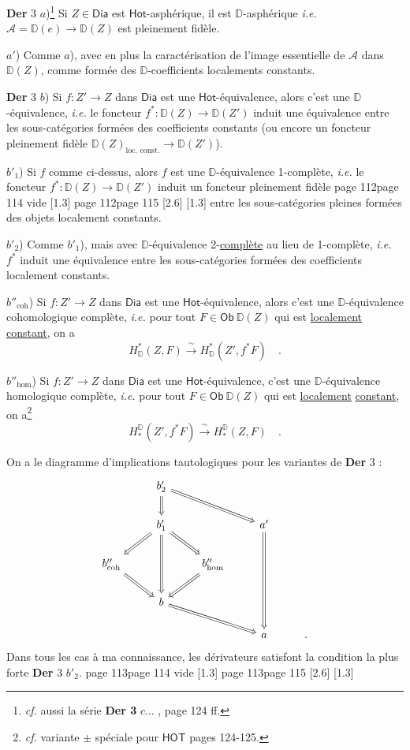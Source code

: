 \documentclass[11pt,leqno]{article}
\newcommand{\printedpage}[1]{\marginnote{\scriptsize\sffamily ed.\ #1}}
\newcommand{\msp}[1]{%
  \begingroup\def\thismsp{#1}\def\blankmsp{page 114 vide}%
  \ifx\thismsp\blankmsp
    \marginnote{\scriptsize\sffamily [114: vide]}[1.3\baselineskip]%
  \else\def\followingmsp{page 115}%
    \ifx\thismsp\followingmsp
      \marginnote{\scriptsize\sffamily [page 115]}[2.6\baselineskip]%
    \else\marginnote{\scriptsize\sffamily [#1]}[1.3\baselineskip]\fi
  \fi\endgroup}
\newcommand{\DD}{\ensuremath{\mathbb{D}}}
\newcommand{\Dia}{\ensuremath{\mathsf{Dia}}}
\newcommand{\Hot}{\ensuremath{\mathsf{Hot}}}
\newcommand{\HOT}{\ensuremath{\mathsf{HOT}}}
\begin{document}
\textbf{Der} 3 $a$)\footnote[58]{\textit{cf.} aussi la série \textbf{Der 3} $c \ldots$ , page 124 ff.} Si $Z \in \mathsf{Dia}$ est \Hot-asphérique, il est $\DD$-asphérique \textit{i.e.} $\mathcal{A} = \DD(e) \to \DD(Z)$ est pleinement fidèle. %

$a'$) Comme $a$), avec en plus la caractérisation de l'image essentielle de $\mathcal{A}$ dans $\DD(Z)$, comme formée des $\DD$-coefficients localements constants. %

\textbf{Der} 3 $b$) Si $f : Z' \to Z$ dans \Dia{} est une \Hot-équivalence, alors c'est une $\DD$-équivalence, \textit{i.e.} le foncteur $f^{*} : \DD(Z) \to \DD(Z')$ induit une équivalence entre les sous-catégories formées des coefficients constants (ou encore un foncteur pleinement fidèle $\DD(Z)_{\text{loc. const.}} \longrightarrow \DD(Z')$).

$b'_1$) Si $f$ comme ci-dessus, alors $f$ est une $\DD$-équivalence 1-complète, \textit{i.e.} le foncteur $f^{*} : \DD(Z) \to \DD(Z')$ induit un foncteur pleinement fidèle
\msp{page 112}
entre les sous-catégories pleines formées des objets localement constants.

$b'_2$) Comme $b'_1$), mais avec $\DD$-équivalence 2-\underline{complète} au lieu de 1-complète, \textit{i.e.} $f^{*}$ induit une équivalence entre les sous-catégories formées des coefficients localement constants.

$b''_{\mathrm{coh}}$) Si $f : Z' \to Z$ dans \Dia{} est une \Hot-équivalence, alors c'est une $\DD$-équivalence cohomologique complète, \textit{i.e.} pour tout $F \in \mathsf{Ob}\ \DD(Z)$ qui est \underline{localement} \underline{constant}, on a
\[ H^{*}_{\DD}(Z,F) \xrightarrow{\ \sim\ } H^{*}_{\DD}(Z',f^{*}F) \quad . \]

$b''_{\mathrm{hom}}$) Si $f : Z' \to Z$ dans \Dia{} est une \Hot-équivalence, c'est une $\DD$-équivalence homologique complète, \textit{i.e.} pour tout $F \in \mathsf{Ob}\ \DD(Z)$ qui est \underline{localement} \underline{constant}, on a\footnote[59]{\textit{cf.} variante $\pm$ spéciale pour \HOT{} pages 124-125.}
\[ H_{*}^{\DD}(Z',f^{*}F) \xrightarrow{\ \sim\ } H_{*}^{\DD}(Z,F) \quad . \]

\printedpage{67}

On a le diagramme d'implications tautologiques pour les variantes de \textbf{Der} 3 :
\[
\begin{tikzcd}
 & b'_2 \arrow[d, Rightarrow] \arrow[drr, Rightarrow] & & & \\
 & b'_1 \arrow[dl, Rightarrow] \arrow[dr, Rightarrow] \arrow[dd, Rightarrow] & & a' \arrow[ddd, Rightarrow] & \\
b''_{\mathrm{coh}} \arrow[dr, Rightarrow] & & b''_{\mathrm{hom}} \arrow[dl, Rightarrow] & & \\
 & b \arrow[drr, Rightarrow] & & & \\
 & & & a & .
\end{tikzcd}
\]
Dans tous les cas à ma connaissance, les dérivateurs satisfont la condition la plus forte \textbf{Der} 3 $b'_2$.
\msp{page 113}
\end{document}
